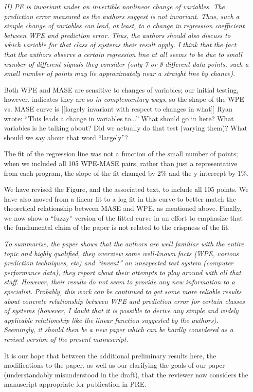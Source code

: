\documentclass[12pt]{article}
\newcommand{\alert}[1]{{\color{red}#1}}
\begin{document}
\emph{II) PE is invariant under an invertible nonlinear change of
  variables. The prediction error measured as the authors suggest is
  not invariant. Thus, such a simple change of variables can lead, at
  least, to a change in regression coefficient between WPE and
  prediction error. Thus, the authors should also discuss to which
  variable for that class of systems their result apply. I think that
  the fact that the authors observe a certain regression line at all
  seems to be due to small number of different signals they consider
  (only 7 or 8 different data points, such a small number of points
  may lie approximately near a straight line by chance).}

Both WPE and MASE are sensitive to changes of variables; our initial
testing, however, indicates they are so \emph{in complementary ways},
so the shape of the WPE vs. MASE curve is [[largely invariant with
    respect to changes in what]] \alert{Ryan wrote: ``This leads a
  change in variables to...''  What should go in here?  What variables
  is he talking about?  Did we actually do that test (varying them)?
  What should we say about that word ``largely''?}

The fit of the regression line was not a function of the small number
of points; when we included all 105 WPE-MASE pairs, rather than just a
representative from each program, the slope of the fit changed by 2\%
and the y intercept by 1\%.

We have revised the Figure, and the associated text, to include all
105 points.  We have also moved from a linear fit to a log fit in this
curve to better match the theoretical relationship between MASE and
WPE, as mentioned above.  Finally, we now show a ``fuzzy'' version of
the fitted curve in an effort to emphasize that the fundamental claim
of the paper is not related to the crispness of the fit.

\emph{To summarize, the paper shows that the authors are well familiar
  with the entire topic and highly qualified, they overview some
  well-known facts (WPE, various prediction techniques, etc) and
  ``invent'' an unexpected test system (computer performance data),
  they report about their attempts to play around with all that
  staff. However, their results do not seem to provide any new
  information to a specialist. Probably, this work can be continued to
  get some more reliable results about concrete relationship between
  WPE and prediction error for certain classes of systems (however, I
  doubt that it is possible to derive any simple and widely applicable
  relationship like the linear function suggested by the
  authors). Seemingly, it should then be a new paper which can be
  hardly considered as a revised version of the present manuscript.}

It is our hope that between the additional preliminary results here,
the modifications to the paper, as well as our clarifying the goals of
our paper (understandably misunderstood in the draft), that the
reviewer now considers the manuscript appropriate for publication in
PRE.
\end{document}
